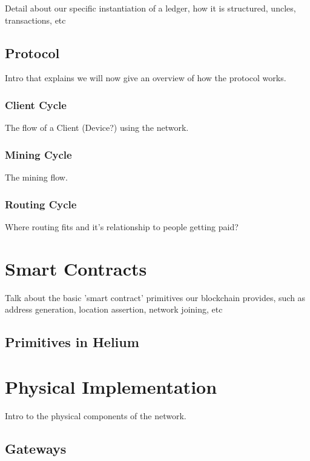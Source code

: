 \documentclass[a4paper,12pt]{article}
\begin{document}
Detail about our specific instantiation of a ledger, how it is structured, uncles, transactions, etc

\subsection{Protocol}

Intro that explains we will now give an overview of how the protocol works.

\subsubsection{Client Cycle}

The flow of a Client (Device?) using the network.

\subsubsection{Mining Cycle}

The mining flow.

\subsubsection{Routing Cycle}

Where routing fits and it's relationship to people getting paid?

\section{Smart Contracts}

Talk about the basic 'smart contract' primitives our blockchain provides, such as address generation, location assertion, network joining, etc

\subsection{Primitives in Helium}

\section{Physical Implementation}

Intro to the physical components of the network.

\subsection{Gateways}
\end{document}
